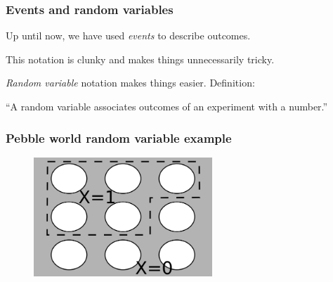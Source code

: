 \documentclass{beamer}
\begin{document}
	\begin{frame}
		\frametitle{Events and random variables}
		Up until now, we have used \textit{events} to describe outcomes.
		
		\vspace{0.5cm}
		
		This notation is clunky and makes things unnecessarily tricky.
		
		\vspace{0.5cm}
		
		\textit{Random variable} notation makes things easier. Definition:
		
		\vspace{0.5cm}
		
		``A random variable associates outcomes of an experiment with a number.''
		
	\end{frame}
	
	\begin{frame}
		\frametitle{Pebble world random variable example}
		
		\begin{figure}[ht]
			\includegraphics[width=0.6\textwidth]{./figures/pebble_world_rvs.png}
		\end{figure}
		
	\end{frame}
	
\end{document}
